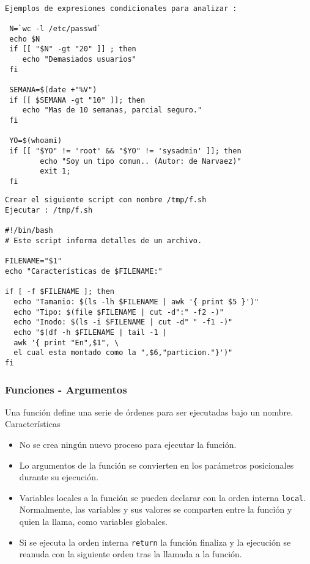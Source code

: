 \documentclass{beamer}
\begin{document}
\begin{Verbatim}

Ejemplos de expresiones condicionales para analizar :

 N=`wc -l /etc/passwd`
 echo $N
 if [[ "$N" -gt "20" ]] ; then 
	echo "Demasiados usuarios"
 fi

 SEMANA=$(date +"%V")
 if [[ $SEMANA -gt "10" ]]; then
	echo "Mas de 10 semanas, parcial seguro."
 fi

 YO=$(whoami)
 if [[ "$YO" != 'root' && "$YO" != 'sysadmin' ]]; then
        echo "Soy un tipo comun.. (Autor: de Narvaez)"
        exit 1;
 fi

\end{Verbatim}


\begin{Verbatim}
Crear el siguiente script con nombre /tmp/f.sh
Ejecutar : /tmp/f.sh

#!/bin/bash
# Este script informa detalles de un archivo.

FILENAME="$1"
echo "Características de $FILENAME:"

if [ -f $FILENAME ]; then
  echo "Tamanio: $(ls -lh $FILENAME | awk '{ print $5 }')"
  echo "Tipo: $(file $FILENAME | cut -d":" -f2 -)"
  echo "Inodo: $(ls -i $FILENAME | cut -d" " -f1 -)"
  echo "$(df -h $FILENAME | tail -1 | 
  awk '{ print "En",$1", \
  el cual esta montado como la ",$6,"particion."}')"
fi
\end{Verbatim}



\begin{frame}
\frametitle{Funciones - Argumentos}
       Una  función define una serie de órdenes para ser ejecutadas bajo un nombre. Características

\begin{itemize}
\item No  se crea ningún nuevo proceso para ejecutar la función.
\item Lo argumentos de  la  función  se
       convierten  en los parámetros posicionales durante su ejecución.
\item 
       Variables locales a la función se pueden declarar con la orden interna \texttt{local}.
Normalmente, las
       variables y sus valores se comparten entre la función y quien la llama, como variables globales.

\item
       Si se ejecuta la orden interna \texttt{return} la función finaliza y la ejecución se reanuda con
       la  siguiente  orden tras la llamada a la función. 

\end{itemize}
\end{frame}
\end{document}
